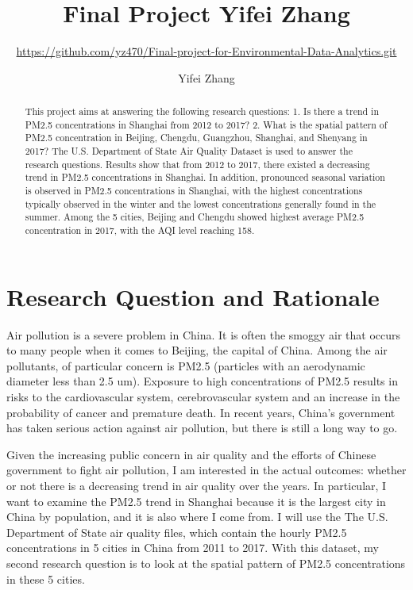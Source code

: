 \documentclass[12pt,]{article}
\title{Final Project Yifei Zhang}
\subtitle{\url{https://github.com/yz470/Final-project-for-Environmental-Data-Analytics.git}}
\author{Yifei Zhang}
\date{}
\begin{document}
\maketitle
\begin{abstract}
This project aims at answering the following research questions: 1. Is
there a trend in PM2.5 concentrations in Shanghai from 2012 to 2017? 2.
What is the spatial pattern of PM2.5 concentration in Beijing, Chengdu,
Guangzhou, Shanghai, and Shenyang in 2017? The U.S. Department of State
Air Quality Dataset is used to answer the research questions. Results
show that from 2012 to 2017, there existed a decreasing trend in PM2.5
concentrations in Shanghai. In addition, pronounced seasonal variation
is observed in PM2.5 concentrations in Shanghai, with the highest
concentrations typically observed in the winter and the lowest
concentrations generally found in the summer. Among the 5 cities,
Beijing and Chengdu showed highest average PM2.5 concentration in 2017,
with the AQI level reaching 158.
\end{abstract}

\newpage

\tableofcontents  \newpage
\listoftables  \newpage
\listoffigures  \newpage

\section{Research Question and
Rationale}\label{research-question-and-rationale}

Air pollution is a severe problem in China. It is often the smoggy air
that occurs to many people when it comes to Beijing, the capital of
China. Among the air pollutants, of particular concern is PM2.5
(particles with an aerodynamic diameter less than 2.5 um). Exposure to
high concentrations of PM2.5 results in risks to the cardiovascular
system, cerebrovascular system and an increase in the probability of
cancer and premature death. In recent years, China's government has
taken serious action against air pollution, but there is still a long
way to go.

Given the increasing public concern in air quality and the efforts of
Chinese government to fight air pollution, I am interested in the actual
outcomes: whether or not there is a decreasing trend in air quality over
the years. In particular, I want to examine the PM2.5 trend in Shanghai
because it is the largest city in China by population, and it is also
where I come from. I will use the The U.S. Department of State air
quality files, which contain the hourly PM2.5 concentrations in 5 cities
in China from 2011 to 2017. With this dataset, my second research
question is to look at the spatial pattern of PM2.5 concentrations in
these 5 cities.
\end{document}
